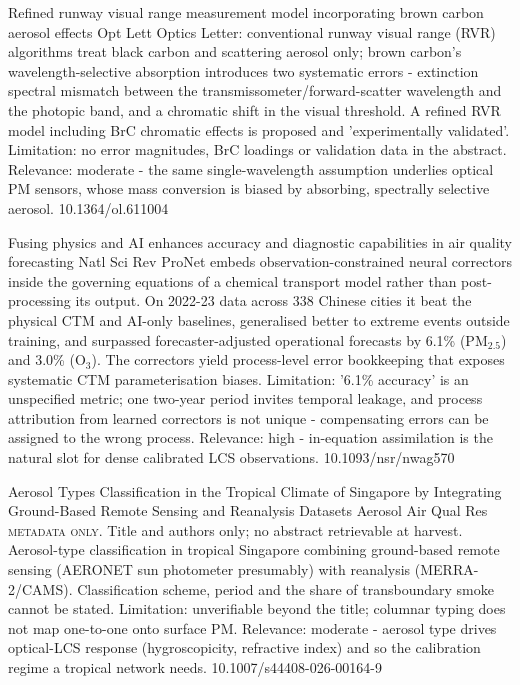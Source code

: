 \documentclass[10pt]{article}
\begin{document}
{Refined runway visual range measurement model incorporating brown carbon aerosol effects}
{Opt Lett}
{Optics Letter: conventional runway visual range (RVR) algorithms treat black carbon and scattering aerosol only; brown carbon's wavelength-selective absorption introduces two systematic errors - extinction spectral mismatch between the transmissometer/forward-scatter wavelength and the photopic band, and a chromatic shift in the visual threshold. A refined RVR model including BrC chromatic effects is proposed and 'experimentally validated'. Limitation: no error magnitudes, BrC loadings or validation data in the abstract. Relevance: moderate - the same single-wavelength assumption underlies optical PM sensors, whose mass conversion is biased by absorbing, spectrally selective aerosol.}
{10.1364/ol.611004}

{Fusing physics and AI enhances accuracy and diagnostic capabilities in air quality forecasting}
{Natl Sci Rev}
{ProNet embeds observation-constrained neural correctors inside the governing equations of a chemical transport model rather than post-processing its output. On 2022-23 data across 338 Chinese cities it beat the physical CTM and AI-only baselines, generalised better to extreme events outside training, and surpassed forecaster-adjusted operational forecasts by 6.1\% (PM$_{2.5}$) and 3.0\% (O$_3$). The correctors yield process-level error bookkeeping that exposes systematic CTM parameterisation biases. Limitation: '6.1\% accuracy' is an unspecified metric; one two-year period invites temporal leakage, and process attribution from learned correctors is not unique - compensating errors can be assigned to the wrong process. Relevance: high - in-equation assimilation is the natural slot for dense calibrated LCS observations.}
{10.1093/nsr/nwag570}

{Aerosol Types Classification in the Tropical Climate of Singapore by Integrating Ground-Based Remote Sensing and Reanalysis Datasets}
{Aerosol Air Qual Res}
{\textsc{metadata only.} Title and authors only; no abstract retrievable at harvest. Aerosol-type classification in tropical Singapore combining ground-based remote sensing (AERONET sun photometer presumably) with reanalysis (MERRA-2/CAMS). Classification scheme, period and the share of transboundary smoke cannot be stated. Limitation: unverifiable beyond the title; columnar typing does not map one-to-one onto surface PM. Relevance: moderate - aerosol type drives optical-LCS response (hygroscopicity, refractive index) and so the calibration regime a tropical network needs.}
{10.1007/s44408-026-00164-9}
\end{document}
